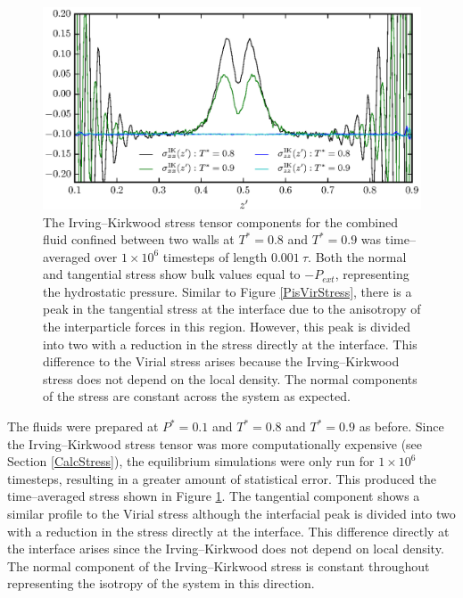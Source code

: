 \begin{figure}[h]
\centering
\includegraphics[scale=1.0]{PisIKStress}
\caption{The Irving--Kirkwood stress tensor components for the combined fluid confined between two walls at $T^{*} = 0.8$ and $T^{*} = 0.9$ was time--averaged over $1 \times 10^{6}$ timesteps of length $0.001\ \tau$.
Both the normal and tangential stress show bulk values equal to $-P_{ext}$, representing the hydrostatic pressure.
Similar to Figure \ref{PisVirStress}, there is a peak in the tangential stress at the interface due to the anisotropy of the interparticle forces in this region.
However, this peak is divided into two with a reduction in the stress directly at the interface.
This difference to the Virial stress arises because the Irving--Kirkwood stress does not depend on the local density. 
The normal components of the stress are constant across the system as expected.
}
\label{PisIKStress}
\end{figure}
\FloatBarrier 
The fluids were prepared at $P^{*}=0.1$ and $T^{*}=0.8$ and $T^{*}=0.9$ as before.
Since the Irving--Kirkwood stress tensor was more computationally expensive (see Section \ref{CalcStress}), the equilibrium simulations were only run for $1 \times 10^{6}$ timesteps, resulting in a greater amount of statistical error.
This produced the time--averaged stress shown in Figure \ref{PisIKStress}.
The tangential component shows a similar profile to the Virial stress although the interfacial peak is divided into two with a reduction in the stress directly at the interface.
This difference directly at the interface arises since the Irving--Kirkwood does not depend on local density.
The normal component of the Irving--Kirkwood stress is constant throughout representing the isotropy of the system in this direction.
\FloatBarrier

